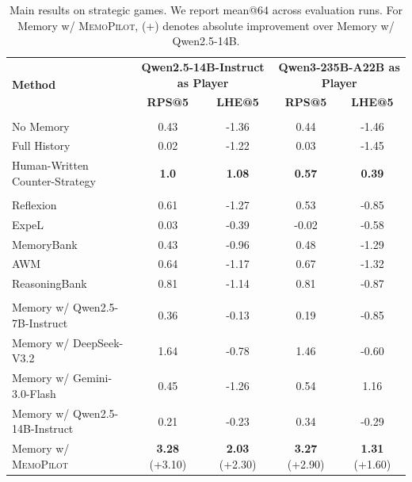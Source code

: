 \documentclass{article}
\newcommand{\methodname}{MemoPilot}
\newcommand{\method}{\textsc{\methodname}}
\theoremstyle{plain}
\theoremstyle{definition}
\theoremstyle{remark}
\begin{document}
\begin{table}[t]
\centering
\caption{Main results on strategic games. We report mean@64 across evaluation runs. For Memory w/ \method{}, (+) denotes absolute improvement over Memory w/ Qwen2.5-14B.}
\label{tab:main}

\begin{tabular}{lcccc}
\toprule
\multirow{2}{*}{\textbf{Method}} & \multicolumn{2}{c}{\textbf{Qwen2.5-14B-Instruct as Player}} & \multicolumn{2}{c}{\textbf{Qwen3-235B-A22B as Player}} \\
 & \textbf{RPS@5 } & \textbf{LHE@5 } & \textbf{RPS@5 } & \textbf{LHE@5 } \\
\midrule
\rowcolor{gray!10} \multicolumn{5}{l}{\textit{Baseline Methods}} \\
No Memory & 0.43 & -1.36 & 0.44 & -1.46 \\
Full History & 0.02 & -1.22 & 0.03 & -1.45 \\
Human-Written Counter-Strategy & \textbf{1.0} & \textbf{1.08} & \textbf{0.57} & \textbf{0.39} \\
\midrule
\rowcolor{gray!10} \multicolumn{5}{l}{\textit{Previous Methods}} \\
Reflexion~\citep{shinn2024reflexion} & 0.61 & -1.27 & 0.53 & -0.85  \\
ExpeL~\citep{zhao2024expel} & 0.03 & -0.39 & -0.02 & -0.58 \\
MemoryBank~\citep{zhong2023memorybank} & 0.43 & -0.96 & 0.48 & -1.29 \\
AWM~\citep{wang2025agent} & 0.64 & -1.17 &  0.67 & -1.32 \\
ReasoningBank~\citep{ouyang2026reasoningbank} & 0.81 & -1.14 & 0.81 & -0.87 \\
\midrule
\rowcolor{gray!10} \multicolumn{5}{l}{\textit{Memory-based Methods}} \\
Memory w/ Qwen2.5-7B-Instruct & 0.36 & -0.13 & 0.19 & -0.85 \\
Memory w/ DeepSeek-V3.2 & 1.64 & -0.78 & 1.46 & -0.60 \\
Memory w/ Gemini-3.0-Flash & 0.45 & -1.26 & 0.54 & 1.16 \\
Memory w/ Qwen2.5-14B-Instruct & 0.21 & -0.23 & 0.34 & -0.29 \\ 
\rowcolor{myblue!20} Memory w/ \method{} & \textbf{3.28} (+3.10) & \textbf{2.03} (+2.30) & \textbf{3.27} (+2.90) & \textbf{1.31} (+1.60) \\
\bottomrule
\end{tabular}

\end{table}
\end{document}
